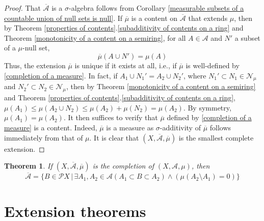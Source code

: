 \documentclass[11pt, a4paper, openany]{book}
\newtheorem{thm}{Theorem}\newtheorem{lem}{Lemma}\newtheorem{crl}{Corollary}
\theoremstyle{definition}
\begin{document}
    \begin{proof}
        That $\overline{\mathscr{A}}$ is a $\sigma$-algebra follows from Corollary \ref{measurable subsets of a countable union of null sets is null}. If $\overline{\mu}$ is a content on $\overline{\mathscr{A}}$ that extends $\mu$, then by Theorem \ref{properties of contents}.\ref{subadditivity of contents on a ring} and  Theorem \ref{monotonicity of a content on a semiring}, for all $A\in\mathscr{A}$ and $N'$ a subset of a $\mu$-null set, \begin{equation}\label{completion of a measure}
            \overline{\mu}(A\cup N')=\mu(A)
        \end{equation}
        Thus, the extension $\overline{\mu}$ is unique if it exists at all, i.e., if $\overline{\mu}$ is well-defined by \eqref{completion of a measure}. In fact, if $A_1\cup N_1'=A_2\cup N_2'$, where $N_1'\subset N_1\in\mathscr{N}_\mu$ and $N_2'\subset N_2\in\mathscr{N}_\mu$,
        then by Theorem \ref{monotonicity of a content on a semiring} and Theorem \ref{properties of contents}.\ref{subadditivity of contents on a ring},
        $\mu(A_1)\leqslant\mu(A_2\cup N_2)\leqslant \mu(A_2)+\mu(N_2)=\mu(A_2)$. By symmetry, $\mu(A_1)=\mu(A_2)$. It then suffices to verify that $\overline{\mu}$ defined by \eqref{completion of a measure} is a content. Indeed, $\overline{\mu}$ is a measure as $\sigma$-additivity of $\overline{\mu}$ follows immediately from that of $\mu$. It is clear that $(X,\overline{\mathscr{A}},\overline{\mu})$ is the smallest complete extension.
    \end{proof}
    \begin{thm}
        If $(X,\overline{\mathscr{A}},\overline{\mu})$ is the completion of $(X,\mathscr{A},\mu)$, then
        \[
            \overline{\mathscr{A}}=\{B\in\mathscr{P}X\,|\,\exists A_1,A_2\in\mathscr{A}(A_1\subset B\subset A_2)\wedge(\mu(A_2\setminus A_1)=0)\}
        \]
    \end{thm}
\section{Extension theorems}
\end{document}
